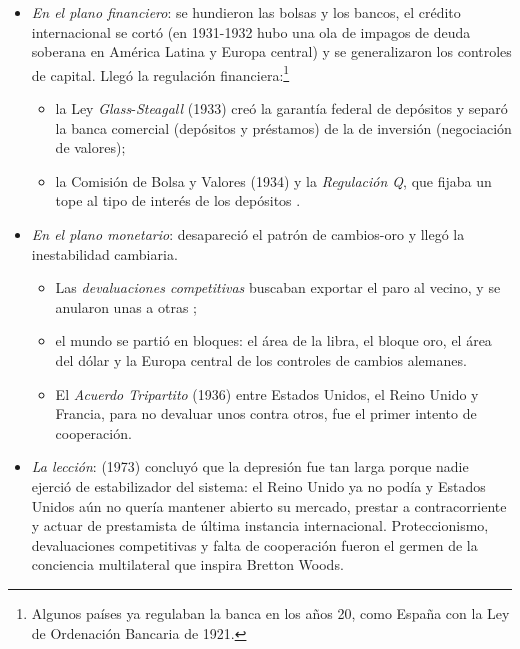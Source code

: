 \documentclass[11pt]{article}
\begin{document}
\begin{itemize}
\begin{itemize}
  \item En 1934, Estados Unidos aprobó la Ley de Acuerdos Comerciales Recíprocos (RTAA), que rebajaba aranceles con la cláusula de nación más favorecida: es el antecedente del GATT.
  \end{itemize}
\item \emph{En el plano financiero}: se hundieron las bolsas y los bancos, el crédito internacional se cortó (en 1931-1932 hubo una ola de impagos de deuda soberana en América Latina y Europa central) y se generalizaron los controles de capital. Llegó la regulación financiera:\footnote{Algunos países ya regulaban la banca en los años 20, como España con la Ley de Ordenación Bancaria de 1921.}
  \begin{itemize}
  \item la Ley \emph{Glass}-\emph{Steagall} (1933) creó la garantía federal de depósitos y separó la banca comercial (depósitos y préstamos) de la de inversión (negociación de valores);
  \item la Comisión de Bolsa y Valores (1934) y la \emph{Regulación Q}, que fijaba un tope al tipo de interés de los depósitos .
  \end{itemize}
\item \emph{En el plano monetario}: desapareció el patrón de cambios-oro y llegó la inestabilidad cambiaria.
  \begin{itemize}
  \item Las \emph{devaluaciones competitivas} buscaban exportar el paro al vecino, y se anularon unas a otras ;
  \item el mundo se partió en bloques: el área de la libra, el bloque oro, el área del dólar y la Europa central de los controles de cambios alemanes.
  \item El \emph{Acuerdo Tripartito} (1936) entre Estados Unidos, el Reino Unido y Francia, para no devaluar unos contra otros, fue el primer intento de cooperación.
  \end{itemize}
\item \emph{La lección}:  (1973) concluyó que la depresión fue tan larga porque nadie ejerció de estabilizador del sistema: el Reino Unido ya no podía y Estados Unidos aún no quería mantener abierto su mercado, prestar a contracorriente y actuar de prestamista de última instancia internacional\nocite{Kindleberger1973World}. Proteccionismo, devaluaciones competitivas y falta de cooperación fueron el germen de la conciencia multilateral que inspira Bretton Woods.
\end{itemize}
\end{document}
